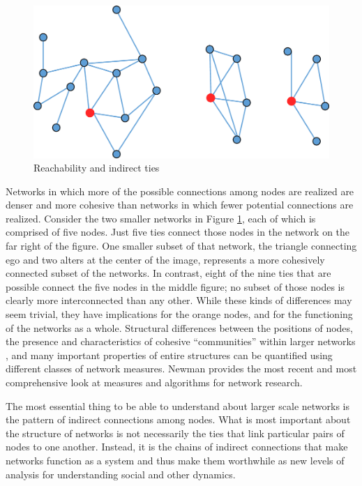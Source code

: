 \documentclass[]{krantz}
\begin{document}
\begin{figure}

{\centering \includegraphics[width=0.7\linewidth]{ChapterNetworks/figures/fig8-4} 

}

\caption{Reachability and indirect ties}\label{fig:fig8-4}
\end{figure}

Networks in which more of the possible connections among nodes are
realized are denser and more cohesive than networks in which fewer
potential connections are realized. Consider the two smaller networks in
Figure \ref{fig:fig8-4}, each of which is comprised of five nodes. Just
five ties connect those nodes in the network on the far right of the
figure. One smaller subset of that network, the triangle connecting ego
and two alters at the center of the image, represents a more cohesively
connected subset of the networks. In contrast, eight of the nine ties
that are possible connect the five nodes in the middle figure; no subset
of those nodes is clearly more interconnected than any other. While
these kinds of differences may seem trivial, they have implications for
the orange nodes, and for the functioning of the networks as a whole.
Structural differences between the positions of nodes, the presence and
characteristics of cohesive ``communities'' within larger networks
\citep{girvan2002community}, and many important properties of entire
structures can be quantified using different classes of network
measures. Newman \citeyearpar{newman2010networks} provides the most
recent and most comprehensive look at measures and algorithms for
network research.

The most essential thing to be able to understand about larger scale
networks is the pattern of indirect connections among nodes. What is
most important about the structure of networks is not necessarily the
ties that link particular pairs of nodes to one another. Instead, it is
the chains of indirect connections that make networks function as a
system and thus make them worthwhile as new levels of analysis for
understanding social and other dynamics.
\end{document}
